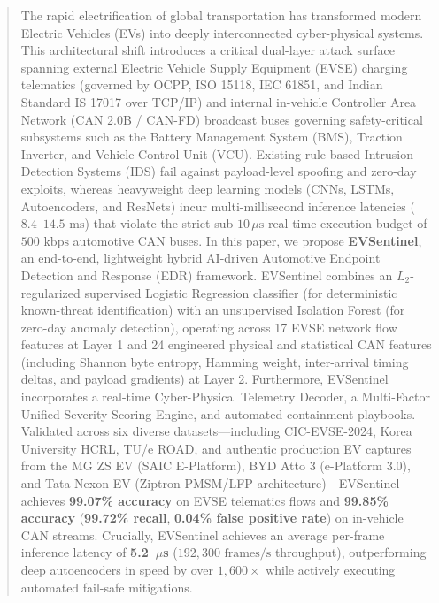 \documentclass[conference]{IEEEtran}
\begin{document}
\begin{abstract}
The rapid electrification of global transportation has transformed modern Electric Vehicles (EVs) into deeply interconnected cyber-physical systems. This architectural shift introduces a critical dual-layer attack surface spanning external Electric Vehicle Supply Equipment (EVSE) charging telematics (governed by OCPP, ISO 15118, IEC 61851, and Indian Standard IS 17017 over TCP/IP) and internal in-vehicle Controller Area Network (CAN 2.0B / CAN-FD) broadcast buses governing safety-critical subsystems such as the Battery Management System (BMS), Traction Inverter, and Vehicle Control Unit (VCU). Existing rule-based Intrusion Detection Systems (IDS) fail against payload-level spoofing and zero-day exploits, whereas heavyweight deep learning models (CNNs, LSTMs, Autoencoders, and ResNets) incur multi-millisecond inference latencies ($8.4\text{--}14.5\text{ ms}$) that violate the strict sub-$10\,\mu\text{s}$ real-time execution budget of $500\text{ kbps}$ automotive CAN buses. In this paper, we propose \textbf{EVSentinel}, an end-to-end, lightweight hybrid AI-driven Automotive Endpoint Detection and Response (EDR) framework. EVSentinel combines an $L_2$-regularized supervised Logistic Regression classifier (for deterministic known-threat identification) with an unsupervised Isolation Forest (for zero-day anomaly detection), operating across 17 EVSE network flow features at Layer 1 and 24 engineered physical and statistical CAN features (including Shannon byte entropy, Hamming weight, inter-arrival timing deltas, and payload gradients) at Layer 2. Furthermore, EVSentinel incorporates a real-time Cyber-Physical Telemetry Decoder, a Multi-Factor Unified Severity Scoring Engine, and automated containment playbooks. Validated across six diverse datasets---including CIC-EVSE-2024, Korea University HCRL, TU/e ROAD, and authentic production EV captures from the MG ZS EV (SAIC E-Platform), BYD Atto 3 (e-Platform 3.0), and Tata Nexon EV (Ziptron PMSM/LFP architecture)---EVSentinel achieves \textbf{99.07\% accuracy} on EVSE telematics flows and \textbf{99.85\% accuracy} (\textbf{99.72\% recall}, \textbf{0.04\% false positive rate}) on in-vehicle CAN streams. Crucially, EVSentinel achieves an average per-frame inference latency of \textbf{5.2~$\mu$s} ($192,300\text{ frames/s}$ throughput), outperforming deep autoencoders in speed by over $1,600\times$ while actively executing automated fail-safe mitigations.
\end{abstract}
\end{document}
